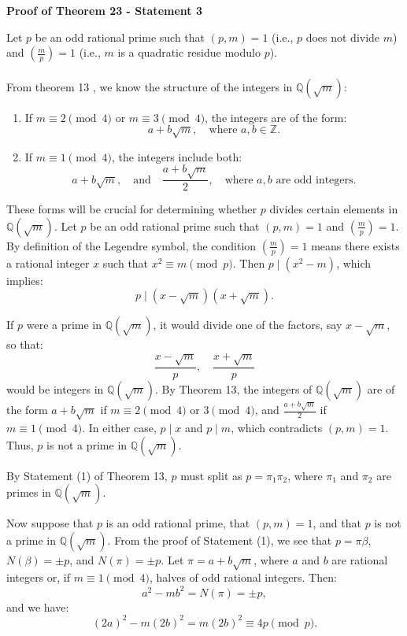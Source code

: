 \documentclass{article}
\newenvironment{proofbox}
  {\begin{mdframed}[linewidth=1pt,linecolor=black,backgroundcolor=white]\noindent\ignorespaces}
  {\end{mdframed}}
\begin{document}
\textbf{Proof of Theorem 23 - Statement 3}\\
\begin{proofbox}
    Let $p$ be an odd rational prime such that $(p, m) = 1$ (i.e., $p$ does not divide $m$) and $\left( \frac{m}{p} \right) = 1$ (i.e., $m$ is a quadratic residue modulo $p$).\\\\
From theorem 13 , we know the structure of the integers in $\mathbb{Q}(\sqrt{m})$:
\begin{enumerate}
    \item If $m \equiv 2 \pmod{4}$ or $m \equiv 3 \pmod{4}$, the integers are of the form:
    \[
    a + b\sqrt{m}, \quad \text{where } a, b \in \mathbb{Z}.
    \]
    \item If $m \equiv 1 \pmod{4}$, the integers include both:
    \[
    a + b\sqrt{m}, \quad \text{and} \quad \frac{a + b\sqrt{m}}{2}, \quad \text{where } a, b \text{ are odd integers.}
    \]
\end{enumerate}
These forms will be crucial for determining whether $p$ divides certain elements in $\mathbb{Q}(\sqrt{m})$.
\noindent
Let \( p \) be an odd rational prime such that \( (p, m) = 1 \) and \( \left( \frac{m}{p} \right) = 1 \). By definition of the Legendre symbol, the condition \( \left( \frac{m}{p} \right) = 1 \) means there exists a rational integer \( x \) such that \( x^2 \equiv m \pmod{p} \). Then \( p \mid (x^2 - m) \), which implies:
\[
p \mid (x - \sqrt{m})(x + \sqrt{m}).
\]

If \( p \) were a prime in \( \mathbb{Q}(\sqrt{m}) \), it would divide one of the factors, say \( x - \sqrt{m} \), so that:
\[
\frac{x - \sqrt{m}}{p}, \quad \frac{x + \sqrt{m}}{p}
\]
would be integers in \( \mathbb{Q}(\sqrt{m}) \). By Theorem 13, the integers of \( \mathbb{Q}(\sqrt{m}) \) are of the form \( a + b\sqrt{m} \) if \( m \equiv 2 \pmod{4} \) or \( 3 \pmod{4} \), and \( \frac{a + b\sqrt{m}}{2} \) if \( m \equiv 1 \pmod{4} \). In either case, \( p \mid x \) and \( p \mid m \), which contradicts \( (p, m) = 1 \). Thus, \( p \) is not a prime in \( \mathbb{Q}(\sqrt{m}) \).

By Statement (1) of Theorem 13, \( p \) must split as \( p = \pi_1 \pi_2 \), where \( \pi_1 \) and \( \pi_2 \) are primes in \( \mathbb{Q}(\sqrt{m}) \).

Now suppose that \( p \) is an odd rational prime, that \( (p, m) = 1 \), and that \( p \) is not a prime in \( \mathbb{Q}(\sqrt{m}) \). From the proof of Statement (1), we see that \( p = \pi \beta \), \( N(\beta) = \pm p \), and \( N(\pi) = \pm p \). Let \( \pi = a + b\sqrt{m} \), where \( a \) and \( b \) are rational integers or, if \( m \equiv 1 \pmod{4} \), halves of odd rational integers. Then:
\[
a^2 - mb^2 = N(\pi) = \pm p,
\]
and we have:
\[
(2a)^2 - m(2b)^2 = m(2b)^2 \equiv 4p \pmod{p}.
\]


\end{proofbox}
\end{document}
